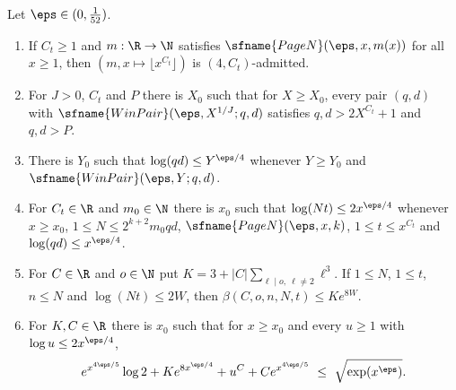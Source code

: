 \begin{lemma}\label{pf:vwin:est}
Let $\eps\in(0,\frac1{52})$.
\begin{enumerate}[label=(\alph*)]
\item\label{pf:vwin:est-adm} If $C_t\ge1$ and $m:\R\to\N$ satisfies $\sfname{PageN}(\eps,x,m(x))$ for all $x\ge1$, then
$(m,x\mapsto\lfloor x^{C_t}\rfloor)$ is $(4,C_t)$-admitted.
\item\label{pf:vwin:est-big} For $J>0$, $C_t$ and $P$ there is $X_0$ such that for $X\ge X_0$, every pair $(q,d)$ with
$\sfname{WinPair}(\eps,X^{1/J};q,d)$ satisfies $q,d>2X^{C_t}+1$ and $q,d>P$.
\item\label{pf:vwin:est-log} There is $Y_0$ such that $\log(qd)\le Y^{\eps/4}$ whenever $Y\ge Y_0$ and
$\sfname{WinPair}(\eps,Y;q,d)$.
\item\label{pf:vwin:est-cond} For $C_t\in\R$ and $m_0\in\N$ there is $x_0$ such that $\log(Nt)\le2x^{\eps/4}$ whenever $x\ge x_0$,
$1\le N\le2^{k+2}m_0qd$, $\sfname{PageN}(\eps,x,k)$, $1\le t\le x^{C_t}$ and $\log(qd)\le x^{\eps/4}$.
\item\label{pf:vwin:est-beta} For $C\in\R$ and $o\in\N$ put $K=3+|C|\sum_{\ell\mid o,\ \ell\ne2}\ell^3$. If $1\le N$, $1\le t$, $n\le N$
and $\log(Nt)\le2W$, then $\beta(C,o,n,N,t)\le Ke^{8W}$.
\item\label{pf:vwin:est-err} For $K,C\in\R$ there is $x_0$ such that for $x\ge x_0$ and every $u\ge1$ with $\log u\le2x^{\eps/4}$,
\[
 e^{x^{4\eps/5}}\log2+Ke^{8x^{\eps/4}}+u^C+Ce^{x^{4\eps/5}}\ \le\ \sqrt{\exp(x^\eps)} .
\]
\end{enumerate}
\end{lemma}

